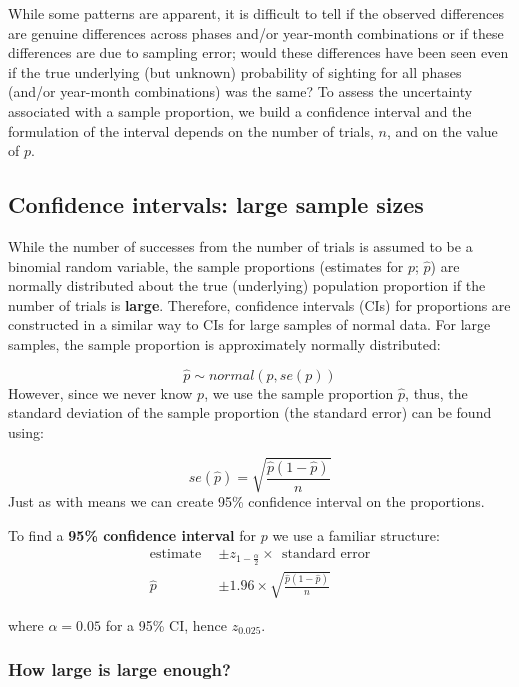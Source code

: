 \documentclass[
  oneside]{krantz}
\begin{document}
While some patterns are apparent, it is difficult to tell if the observed differences are genuine differences across phases and/or year-month combinations or if these differences are due to sampling error; would these differences have been seen even if the true underlying (but unknown) probability of sighting for all phases (and/or year-month combinations) was the same? To assess the uncertainty associated with a sample proportion, we build a confidence interval and the formulation of the interval depends on the number of trials, \(n\), and on the value of \(p\).

\hypertarget{confidence-intervals-large-sample-sizes}{%
\subsection{Confidence intervals: large sample sizes}\label{confidence-intervals-large-sample-sizes}}

While the number of successes from the number of trials is assumed to be a binomial random variable, the sample proportions (estimates for \(p\); \(\hat{p}\)) are normally distributed about the true (underlying) population proportion if the number of trials is \textbf{large}. Therefore, confidence intervals (CIs) for proportions are constructed in a similar way to CIs for large samples of normal data. For large samples, the sample proportion is approximately normally distributed:

\[\hat{p} \sim normal \left(p, se({p})\right)\]
However, since we never know \(p\), we use the sample proportion \(\hat p\), thus, the standard deviation of the sample proportion (the standard error) can be found using:

\[se(\hat{p})=\sqrt{\frac{\hat p (1-\hat p)}{n}}\]
Just as with means we can create 95\% confidence interval on the proportions.

To find a \textbf{95\% confidence interval} for \(p\) we use a familiar structure:
\begin{align*}
          \textrm{estimate}~~ &\pm z_{1-\frac{\alpha}{2}} \times~~ \textrm{standard error}\\
          \hat{p} & \pm 1.96 \times \sqrt{\frac{\hat{p} (1-\hat{p})}{n}}
\end{align*}

where \(\alpha=0.05\) for a 95\% CI, hence \(z_{0.025}\).

\hypertarget{how-large-is-large-enough}{%
\subsubsection{How large is large enough?}\label{how-large-is-large-enough}}
\end{document}

